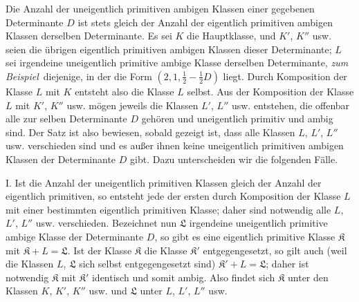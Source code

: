 Die Anzahl der uneigentlich primitiven ambigen Klassen einer gegebenen Determinante $D$ ist stets gleich der Anzahl der eigentlich primitiven ambigen Klassen derselben Determinante. Es sei $K$ die Hauptklasse, und $K'$, $K''$ usw. seien die übrigen eigentlich primitiven ambigen Klassen dieser Determinante; $L$ sei irgendeine uneigentlich primitive ambige Klasse derselben Determinante, \textit{zum Beispiel}\ diejenige, in der die Form $(2,1,\frac12-\frac12 D)$ liegt. Durch Komposition der Klasse $L$ mit $K$ entsteht also die Klasse $L$ selbst. Aus der Komposition der Klasse $L$ mit $K'$, $K''$ usw. mögen jeweils die Klassen $L'$, $L''$ usw. entstehen, die offenbar alle zur selben Determinante $D$ gehören und uneigentlich primitiv und ambig sind. Der Satz ist also bewiesen, sobald gezeigt ist, dass alle Klassen $L$, $L'$, $L''$ usw. verschieden sind und es außer ihnen keine uneigentlich primitiven ambigen Klassen der Determinante $D$ gibt. Dazu unterscheiden wir die folgenden Fälle.

I. Ist die Anzahl der uneigentlich primitiven Klassen gleich der Anzahl der eigentlich primitiven, so entsteht jede der ersten durch Komposition der Klasse $L$ mit einer bestimmten eigentlich primitiven Klasse; daher sind notwendig alle $L$, $L'$, $L''$ usw. verschieden. Bezeichnet nun $\mathfrak{L}$ irgendeine uneigentlich primitive ambige Klasse der Determinante $D$, so gibt es eine eigentlich primitive Klasse $\mathfrak{K}$ mit $\mathfrak{K}+L=\mathfrak{L}$. Ist der Klasse $\mathfrak{K}$ die Klasse $\mathfrak{K}'$ entgegengesetzt, so gilt auch (weil die Klassen $L$, $\mathfrak{L}$ sich selbst entgegengesetzt sind) $\mathfrak{K}'+L=\mathfrak{L}$; daher ist notwendig $\mathfrak{K}$ mit $\mathfrak{K}'$ identisch und somit ambig. Also findet sich $\mathfrak{K}$ unter den Klassen $K$, $K'$, $K''$ usw. und $\mathfrak{L}$ unter $L$, $L'$, $L''$ usw.


